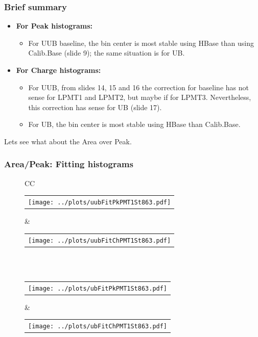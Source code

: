 \documentclass[aspectratio=169]{beamer}
\begin{document}
\begin{frame}
	\frametitle{Brief summary}
	\begin{itemize}
		\item {\bf For Peak histograms:}
			\begin{itemize}
					\item For UUB baseline, the bin center is most stable using HBase 
						than using Calib.Base (slide 9); the same situation is for UB.
			\end{itemize}
			\vspace{0.5cm}
		\item {\bf For Charge histograms:}
			\begin{itemize}
					\item For UUB, from slides 14, 15 and 16 the correction for 
						baseline has not sense for LPMT1 and LPMT2, but maybe if for 
						LPMT3. Nevertheless, this correction has sense for UB (slide 17).
					\item For UB, the bin center is most stable using HBase than Calib.Base.
			\end{itemize}
	\end{itemize}
	\vspace{0.5cm}
	Lets see what about the Area over Peak.

\end{frame}

\begin{frame}
	\frametitle{Area/Peak: Fitting histograms}
	\begin{figure}
		\centering
		\begin{tabularx}{\textwidth}{CC}
			\\
			\begin{tabular}{l}
				\texttt{[image: ../plots/uubFitPkPMT1St863.pdf]}
			\end{tabular}
			&
			\begin{tabular}{l}
				\texttt{[image: ../plots/uubFitChPMT1St863.pdf]}
			\end{tabular}
			\\
			\\
			\begin{tabular}{l}
				\texttt{[image: ../plots/ubFitPkPMT1St863.pdf]}
			\end{tabular}
			&
			\begin{tabular}{l}
				\texttt{[image: ../plots/ubFitChPMT1St863.pdf]}
			\end{tabular}
		\end{tabularx}
	\end{figure}
\end{frame}
\end{document}
